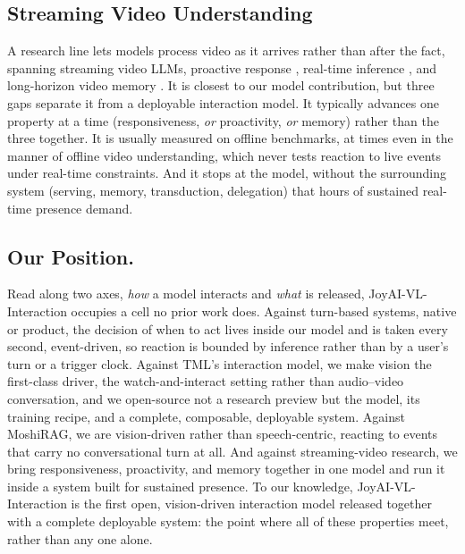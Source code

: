 \subsection{Streaming Video Understanding}
A research line lets models process video as it arrives rather than after the fact, spanning streaming video LLMs, proactive response \cite{xia2025streamingvideoinstructiontuning,qian2025dispider,yan2026proactvl}, real-time inference \cite{xu2025streamingvlmrealtimeunderstandinginfinite,wang2026acceleratingstreamingvideolarge}, and long-horizon video memory \cite{yao2025timechatonline,zhang2026hermeskvcachehierarchical,zeng2026streamforest}. It is closest to our model contribution, but three gaps separate it from a deployable interaction model. It typically advances one property at a time (responsiveness, \textit{or} proactivity, \textit{or} memory) rather than the three together. It is usually measured on offline benchmarks, at times even in the manner of offline video understanding, which never tests reaction to live events under real-time constraints. And it stops at the model, without the surrounding system (serving, memory, transduction, delegation) that hours of sustained real-time presence demand. 

\subsection{Our Position.} Read along two axes, \textit{how} a model interacts and \textit{what} is released, JoyAI-VL-Interaction occupies a cell no prior work does. Against turn-based systems, native or product, the decision of when to act lives inside our model and is taken every second, event-driven, so reaction is bounded by inference rather than by a user's turn or a trigger clock. Against TML's interaction model, we make vision the first-class driver, the watch-and-interact setting rather than audio--video conversation, and we open-source not a research preview but the model, its training recipe, and a complete, composable, deployable system. Against MoshiRAG, we are vision-driven rather than speech-centric, reacting to events that carry no conversational turn at all. And against streaming-video research, we bring responsiveness, proactivity, and memory together in one model and run it inside a system built for sustained presence. To our knowledge, JoyAI-VL-Interaction is the first open, vision-driven interaction model released together with a complete deployable system: the point where all of these properties meet, rather than any one alone.